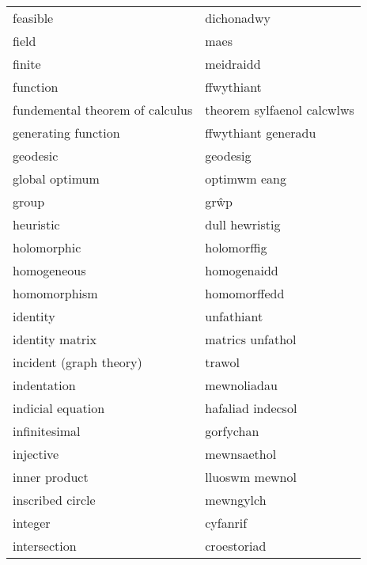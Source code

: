 \begin{supertabular}{p{0.22\textwidth}p{0.22\textwidth}}
                         feasible &                       dichonadwy \\
                            field &                             maes \\
                           finite &                        meidraidd \\
                         function &                       ffwythiant \\
  fundemental theorem of calculus &       theorem sylfaenol calcwlws \\
              generating function &              ffwythiant generadu \\
                         geodesic &                         geodesig \\
                   global optimum &                     optimwm eang \\
                            group &                             grŵp \\
                        heuristic &                   dull hewristig \\
                      holomorphic &                      holomorffig \\
                      homogeneous &                      homogenaidd \\
                     homomorphism &                     homomorffedd \\
                         identity &                       unfathiant \\
                  identity matrix &                 matrics unfathol \\
          incident (graph theory) &                           trawol \\
                      indentation &                      mewnoliadau \\
                indicial equation &                hafaliad indecsol \\
                    infinitesimal &                        gorfychan \\
                        injective &                      mewnsaethol \\
                    inner product &                   lluoswm mewnol \\
                 inscribed circle &                        mewngylch \\
                          integer &                         cyfanrif \\
                     intersection &                      croestoriad \\

\end{supertabular}
